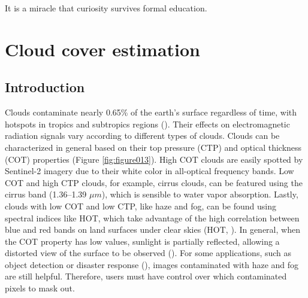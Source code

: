 \documentclass[a4paper, nobind]{templates/cdethesis}
\begin{document}
\begin{savequote}
It is a miracle that curiosity survives formal education.
\end{savequote}



\hypertarget{cloud-cover-estimation}{%
\chapter{Cloud cover estimation}\label{cloud-cover-estimation}}

\minitoc 

\hypertarget{introduction-1}{%
\section{Introduction}\label{introduction-1}}

Clouds contaminate nearly 0.65\% of the earth's surface regardless of time, with hotspots in tropics and subtropics regions (\cite{sassen2008classifying, winker2010calipso, Wilson2016}). Their effects on electromagnetic radiation signals vary according to different types of clouds. Clouds can be characterized in general based on their top pressure (CTP) and optical thickness (COT) properties (Figure \ref{fig:figure013}). High COT clouds are easily spotted by Sentinel-2 imagery due to their white color in all-optical frequency bands. Low COT and high CTP clouds, for example, cirrus clouds, can be featured using the cirrus band (1.36--1.39 \(\mu m\)), which is sensible to water vapor absorption. Lastly, clouds with low COT and low CTP, like haze and fog, can be found using spectral indices like HOT, which take advantage of the high correlation between blue and red bands on land surfaces under clear skies (HOT, \cite{zhang2002}). In general, when the COT property has low values, sunlight is partially reflected, allowing a distorted view of the surface to be observed (\cite{lynch2002cirrus, chen2017}). For some applications, such as object detection or disaster response (\cite{Mateo-Garcia2021}), images contaminated with haze and fog are still helpful. Therefore, users must have control over which contaminated pixels to mask out.
\end{document}
